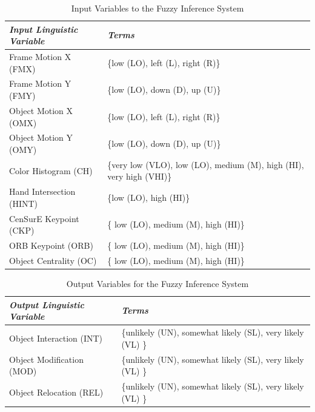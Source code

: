 \documentclass[12pt]{report}
\begin{document}
\begin{table}
\caption{Input Variables to the Fuzzy Inference System}

\begin{center}
\begin{tabular}{|p{}|p{}|}
\hline
\textbf{\textit{Input Linguistic Variable}}&\textbf{\textit{Terms}} \\
\hline
\hline
Frame Motion X (FMX) & \{low (LO), left (L), right (R)\} \\
\hline
Frame Motion Y (FMY) & \{low (LO), down (D), up (U)\} \\
\hline
Object Motion X (OMX) & \{low (LO), left (L), right (R)\} \\ 
\hline
Object Motion Y (OMY) & \{low (LO), down (D), up (U)\} \\ 
\hline
Color Histogram (CH) & \{very low (VLO), low (LO), medium (M), high (HI), very high (VHI)\} \\
\hline
Hand Intersection (HINT) & \{low (LO), high (HI)\} \\
\hline
CenSurE Keypoint (CKP) & \{ low (LO), medium (M), high (HI)\}  \\
\hline
ORB Keypoint (ORB) & \{ low (LO), medium (M), high (HI)\}  \\
\hline
Object Centrality (OC) & \{ low (LO), medium (M), high (HI)\} \\
\hline
\end{tabular}
\end{center}
\label{inputFeatures}
\end{table}


\begin{table}
\caption{Output Variables for the Fuzzy Inference System}

\begin{center}
\begin{tabular}{|p{}|p{}|}
\hline
\textbf{\textit{Output Linguistic Variable}}&\textbf{\textit{Terms}} \\
\hline
\hline
Object Interaction (INT) & \{unlikely (UN), somewhat likely (SL), very likely (VL) \} \\
\hline
Object Modification (MOD) & \{unlikely (UN), somewhat likely (SL), very likely (VL) \} \\
\hline
Object Relocation (REL) & \{unlikely (UN), somewhat likely (SL), very likely (VL) \} \\
\hline
\end{tabular}
\end{center}
\label{outputFeatures}
\end{table}
\end{document}
